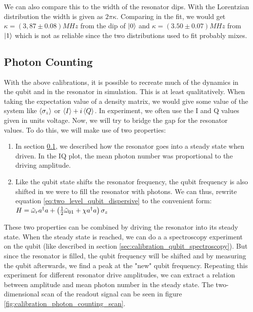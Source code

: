 We can also compare this to the width of the resonator dips. With the Lorentzian distribution the width is given as $2 \pi \kappa$. Comparing in the fit, we would get $\kappa = (3,87 \pm 0.08) MHz$ from the dip of $\ket{0}$ and $\kappa = (3.50 \pm 0.07) MHz$ from $\ket{1}$ which is not as reliable since the two distributions used to fit probably mixes.   

\subsection{Photon Counting}
With the above calibrations, it is possible to recreate much of the dynamics in the qubit and in the resonator in simulation. This is at least qualitatively. When taking the expectation value of a density matrix, we would give some value of the system like $\expval{\sigma_z}$ or $\expval{I} + i\expval{Q}$. In experiment, we often use the I and Q values given in units voltage. Now, we will try to bridge the gap for the resonator values. To do this, we will make use of two properties: 
\begin{enumerate}
    \item In section \ref{}, we described how the resonator goes into a steady state when driven. In the IQ plot, the mean photon number was proportional to the driving amplitude. 
    \item Like the qubit state shifts the resonator frequency, the qubit frequency is also shifted in we were to fill the resonator with photons. We can thus, rewrite equation \ref{eq:two_level_qubit_dispersive} to the convenient form: $H = \Tilde{\omega}_r a^\dagger a  + \left(\frac12 \Tilde{\omega}_{01} + \chi a^\dagger a\right)  \sigma_z$
\end{enumerate}
These two properties can be combined by driving the resonator into its steady state. When the steady state is reached, we can do a a spectroscopy experiment on the qubit (like described in section \ref{sec:calibration_qubit_spectroscopy}). But since the resonator is filled, the qubit frequency will be shifted and by measuring the qubit afterwards, we find a peak at the "new" qubit frequency. Repeating this experiment for different resonator drive amplitudes, we can extract a relation between amplitude and mean photon number in the steady state. The two-dimensional scan of the readout signal can be seen in figure \ref{fig:calibration_photon_counting_scan}.

